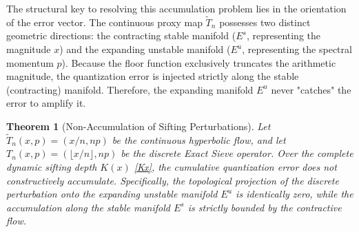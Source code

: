 \documentclass[sn-mathphys-num, pdflatex]{sn-jnl}
\newtheorem{theorem}{Theorem}[section]
\begin{document}
The structural key to resolving this accumulation problem lies in the orientation of the error vector. The continuous proxy map $\tilde{T}_n$ possesses two distinct geometric directions: the contracting stable manifold ($E^s$, representing the magnitude $x$) and the expanding unstable manifold ($E^u$, representing the spectral momentum $p$). Because the floor function exclusively truncates the arithmetic magnitude, the quantization error is injected strictly along the stable (contracting) manifold. Therefore, the expanding manifold $E^u$ never "catches" the error to amplify it.

\begin{theorem}[Non-Accumulation of Sifting Perturbations]
\label{the:non_accumulation}
Let $\tilde{T}_n(x,p) = (x/n, np)$ be the continuous hyperbolic flow, and let $T_n(x,p) = (\lfloor x/n \rfloor, np)$ be the discrete Exact Sieve operator. Over the complete dynamic sifting depth $K(x)$ \ref{Kx}, the cumulative quantization error does not constructively accumulate. Specifically, the topological projection of the discrete perturbation onto the expanding unstable manifold $E^u$ is identically zero, while the accumulation along the stable manifold $E^s$ is strictly bounded by the contractive flow.
\end{theorem}
\end{document}
